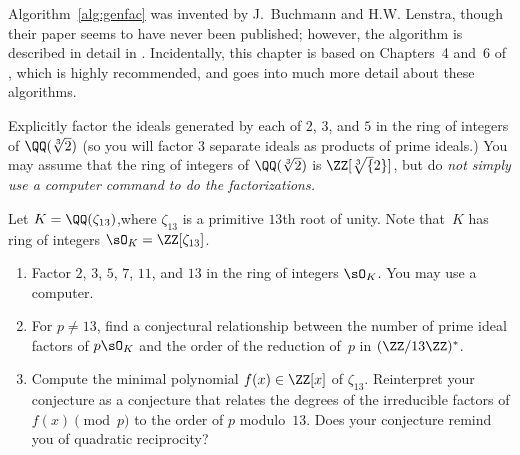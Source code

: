 Algorithm~\ref{alg:genfac} was invented by J.~Buchmann and
H.W. Lenstra, though their paper seems to have never been
published; however, the algorithm is described in detail in
\cite[\S6.2.5]{cohen:course_ant}.  Incidentally, this chapter is based
on Chapters~4 and~6 of \cite{cohen:course_ant}, which is highly
recommended, and goes into much more detail about these algorithms.

\begin{exercise}
  Explicitly factor the ideals generated by each of $2$, $3$, and $5$ in
  the ring of integers of $\QQ(\sqrt[3]{2})$ (so you will factor $3$
  separate ideals as products of prime ideals.)
  You may assume that the ring of integers of $\QQ(\sqrt[3]{2})$
  is $\ZZ[\sqrt[3]{2}]$, but do \em{not} simply use a computer command to do
  the factorizations.
\end{exercise}

\begin{exercise}
  Let $K=\QQ(\zeta_{13})$,where $\zeta_{13}$ is a primitive $13$th root of
  unity. Note that~$K$ has ring of integers $\sO_K=\ZZ[\zeta_{13}]$.
  \begin{enumerate}
    \item Factor $2$, $3$, $5$, $7$, $11$, and $13$ in the ring
    of integers $\sO_K$.  You may use a computer.
    \item For $p\neq 13$, find a conjectural
    relationship between the number of prime ideal factors of $p\sO_K$
    and the order of the reduction of~$p$  in $(\ZZ/13\ZZ)^*$.
    \item Compute the minimal polynomial $f(x)\in\ZZ[x]$ of $\zeta_{13}$.
    Reinterpret your conjecture as a conjecture that
    relates the degrees of the irreducible factors of $f(x)\pmod{p}$ to
    the order of $p$ modulo~$13$. Does your conjecture
    remind you of quadratic reciprocity?
  \end{enumerate}
\end{exercise}


